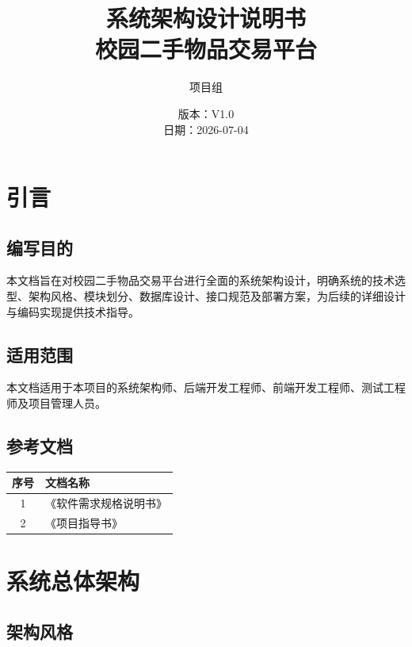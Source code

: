 \documentclass[12pt,a4paper,UTF8]{ctexart}
\title{\textbf{\Huge 系统架构设计说明书}\\[8pt]
       \normalsize 校园二手物品交易平台}
\author{项目组}
\date{版本：V1.0\\[4pt] 日期：2026-07-04}
\begin{document}
\maketitle
\thispagestyle{empty}
\newpage

\tableofcontents
\newpage

\section{引言}

\subsection{编写目的}

本文档旨在对校园二手物品交易平台进行全面的系统架构设计，明确系统的技术选型、架构风格、模块划分、数据库设计、接口规范及部署方案，为后续的详细设计与编码实现提供技术指导。

\subsection{适用范围}

本文档适用于本项目的系统架构师、后端开发工程师、前端开发工程师、测试工程师及项目管理人员。

\subsection{参考文档}

\begin{table}[H]
    \centering
    \begin{tabularx}{\textwidth}{|c|X|}
        \hline
        \textbf{序号} & \textbf{文档名称} \\
        \hline
        1 & 《软件需求规格说明书》 \\
        \hline
        2 & 《项目指导书》 \\
        \hline
    \end{tabularx}
\end{table}

\section{系统总体架构}

\subsection{架构风格}
\end{document}
